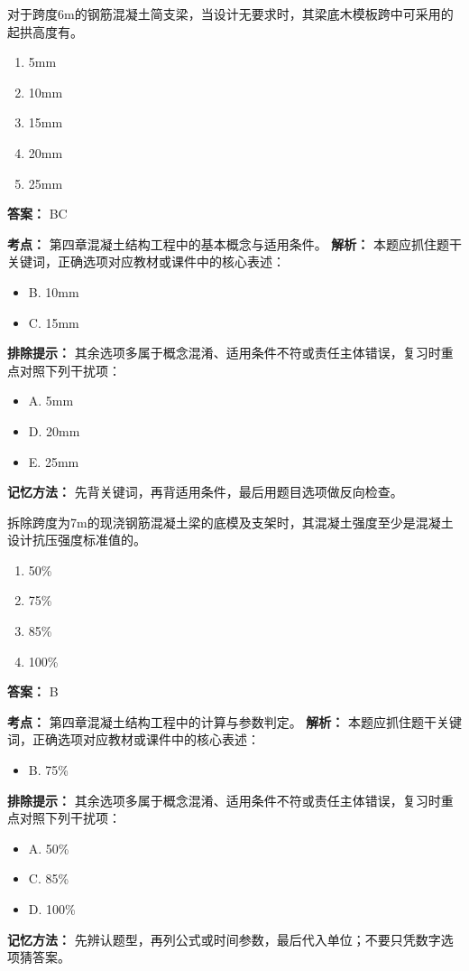 \documentclass[UTF8,fontset=fandol,11pt]{ctexart}
\begin{document}
\begin{quizbox}[title={第 40 题}]
对于跨度6m的钢筋混凝土简支梁，当设计无要求时，其梁底木模板跨中可采用的起拱高度有。\\
\begin{enumerate}[label=\Alph*.]
\item 5mm
\item 10mm
\item 15mm
\item 20mm
\item 25mm
\end{enumerate}
\textbf{答案：} BC
\vspace{0.25em}
\begin{answerbox}[title={考点解析}]
\textbf{考点：} 第四章混凝土结构工程中的基本概念与适用条件。
\textbf{解析：} 本题应抓住题干关键词，正确选项对应教材或课件中的核心表述：
\begin{itemize}
\item B. 10mm
\item C. 15mm
\end{itemize}
\textbf{排除提示：} 其余选项多属于概念混淆、适用条件不符或责任主体错误，复习时重点对照下列干扰项：
\begin{itemize}
\item A. 5mm
\item D. 20mm
\item E. 25mm
\end{itemize}
\textbf{记忆方法：} 先背关键词，再背适用条件，最后用题目选项做反向检查。
\end{answerbox}
\end{quizbox}

\vspace{0.2em}

\begin{quizbox}[title={第 41 题}]
拆除跨度为7m的现浇钢筋混凝土梁的底模及支架时，其混凝土强度至少是混凝土设计抗压强度标准值的。\\
\begin{enumerate}[label=\Alph*.]
\item 50\%
\item 75\%
\item 85\%
\item 100\%
\end{enumerate}
\textbf{答案：} B
\vspace{0.25em}
\begin{answerbox}[title={考点解析}]
\textbf{考点：} 第四章混凝土结构工程中的计算与参数判定。
\textbf{解析：} 本题应抓住题干关键词，正确选项对应教材或课件中的核心表述：
\begin{itemize}
\item B. 75\%
\end{itemize}
\textbf{排除提示：} 其余选项多属于概念混淆、适用条件不符或责任主体错误，复习时重点对照下列干扰项：
\begin{itemize}
\item A. 50\%
\item C. 85\%
\item D. 100\%
\end{itemize}
\textbf{记忆方法：} 先辨认题型，再列公式或时间参数，最后代入单位；不要只凭数字选项猜答案。
\end{answerbox}
\end{quizbox}
\end{document}
